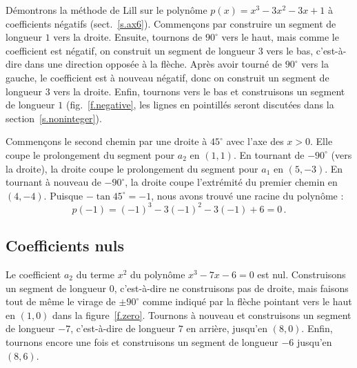 Démontrons la méthode de Lill sur le polynôme $p(x)=x^3-3x^2-3x+1$ à coefficients négatifs (sect.~\ref{s.ax6}). Commençons par construire un segment de longueur $1$ vers la droite. Ensuite, tournons de $90^\circ$ vers le haut, mais comme le coefficient est négatif, on construit un segment de longueur $3$ vers le bas, c'est-à-dire dans une direction opposée à la flèche. Après avoir tourné de $90^\circ$ vers la gauche, le coefficient est à nouveau négatif, donc on construit un segment de longueur $3$ vers la droite. Enfin, tournons vers le bas et construisons un segment de longueur $1$ (fig.~\ref{f.negative}, les lignes en pointillés seront discutées dans la section~\ref{s.noninteger}).

Commençons le second chemin par une droite à $45^\circ$ avec l'axe des $x>0$. Elle coupe le prolongement du segment 
 pour $a_2$ en  $(1,1)$. En tournant de $-90^\circ$ (vers la droite), la droite coupe le prolongement du segment  pour $a_1$ en $(5,-3)$. En tournant à nouveau de $-90^\circ$, la droite coupe l'extrémité du premier chemin en $(4,-4)$. Puisque $-\tan 45^\circ=-1$, nous avons trouvé une racine du polynôme :
\[p(-1)=(-1)^3-3(-1)^2-3(-1)+6=0\,.\]


\subsection{Coefficients nuls}\label{s.zero}

Le coefficient $a_2$ du terme $x^2$ du polynôme $x^3-7x-6=0$ est nul. Construisons un segment de longueur $0$, c'est-à-dire ne construisons pas de droite, mais faisons tout de même le virage de $\pm 90^\circ$ comme indiqué par la flèche pointant vers le haut en  $(1,0)$ dans la figure~\ref{f.zero}. Tournons à nouveau et construisons un segment  de longueur $-7$, c'est-à-dire de longueur $7$ en arrière, jusqu'en $(8,0)$. Enfin, tournons encore une fois et construisons un segment  de longueur $-6$ jusqu'en $(8,6)$.

